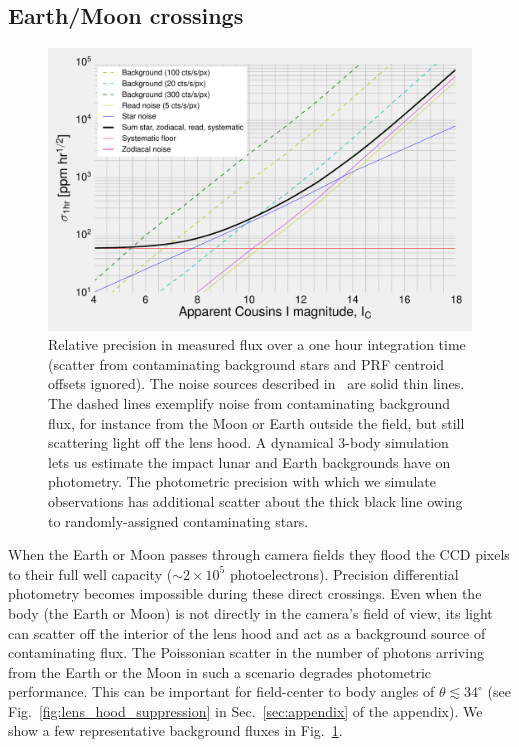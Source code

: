 \subsection{Earth/Moon crossings}
\label{sec:earth_moon_crossings}
\begin{figure}[t]
	\centering
	\includegraphics{figures/precision_memo.pdf}
	\caption{Relative precision in measured flux over a one hour integration time (scatter from contaminating background stars and PRF centroid offsets ignored). The noise sources described in~\citet{Sullivan_2015} are solid thin lines. The dashed lines exemplify noise from contaminating background flux, for instance from the Moon or Earth outside the \tess field, but still scattering light off  the \tess lens hood. A dynamical 3-body simulation lets us estimate the impact  lunar and Earth backgrounds have on \tesss photometry.
	The photometric precision with which we simulate observations has additional scatter about the thick black line owing to randomly-assigned contaminating stars.}
	\label{fig:noise_with_moon}
\end{figure}

When the Earth or Moon passes through \tesss camera fields they flood the CCD pixels to their full well capacity ($\sim2\times10^5$ photoelectrons).
Precision differential photometry becomes impossible during these direct crossings.
Even when the body (the Earth or Moon) is not directly in the camera's field of view, its light can scatter off the interior of the lens hood and act as a background source of contaminating flux.
The Poissonian scatter in the number of photons arriving from the Earth or the Moon in such a scenario degrades \tesss photometric performance.
This can be important for field-center to body angles of $\theta \lesssim34^{\circ}$ (see Fig.~\ref{fig:lens_hood_suppression} in Sec.~\ref{sec:appendix} of the appendix).
We show a few representative background fluxes in Fig.~\ref{fig:noise_with_moon}.


